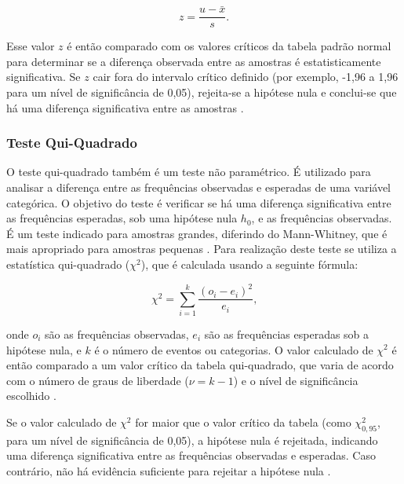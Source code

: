 \[
z = \frac{u - \bar{x}}{s} \text{.}
\]

Esse valor \(z\) é então comparado com os valores críticos da tabela padrão normal para determinar se a diferença observada entre as amostras é estatisticamente significativa. Se \(z\) cair fora do intervalo crítico definido (por exemplo, -1,96 a 1,96 para um nível de significância de 0,05), rejeita-se a hipótese nula e conclui-se que há uma diferença significativa entre as amostras \cite{juristo_basics_2001}.

\subsubsection{Teste Qui-Quadrado}
\label{subsec:chi-square}

O teste qui-quadrado também é um teste não paramétrico. É utilizado para analisar a diferença entre as frequências observadas e esperadas de uma variável categórica. O objetivo do teste é verificar se há uma diferença significativa entre as frequências esperadas, sob uma hipótese nula \(h_0\), e as frequências observadas. É um teste indicado para amostras grandes, diferindo do Mann-Whitney, que é mais apropriado para amostras pequenas \cite{juristo_basics_2001}. Para realização deste teste se utiliza a estatística qui-quadrado (\(\chi^2\)), que é calculada usando a seguinte fórmula:

\[
\chi^2 = \sum_{i=1}^{k} \frac{(o_i - e_i)^2}{e_i} \text{,}
\]

\noindent
onde \(o_i\) são as frequências observadas, \(e_i\) são as frequências esperadas sob a hipótese nula, e \(k\) é o número de eventos ou categorias. O valor calculado de \(\chi^2\) é então comparado a um valor crítico da tabela qui-quadrado, que varia de acordo com o número de graus de liberdade (\(\nu = k - 1\)) e o nível de significância escolhido \cite{juristo_basics_2001}.

Se o valor calculado de \(\chi^2\) for maior que o valor crítico da tabela (como \(\chi^2_{0,95}\), para um nível de significância de 0,05), a hipótese nula é rejeitada, indicando uma diferença significativa entre as frequências observadas e esperadas. Caso contrário, não há evidência suficiente para rejeitar a hipótese nula \cite{juristo_basics_2001}.
